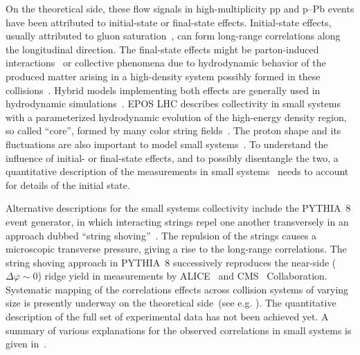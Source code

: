 On the theoretical side, these flow signals in high-multiplicity pp and p--Pb events have been attributed to initial-state or final-state effects. Initial-state effects, usually attributed to gluon saturation~\cite{Dusling:2012cg,Bzdak:2013zma}, can form long-range
correlations along the longitudinal direction. The final-state effects might be parton-induced interactions~\cite{Arbuzov:2011yr} or collective phenomena due to hydrodynamic behavior of the produced matter arising in a high-density system possibly formed in these collisions~\cite{Weller:2017tsr,Zhao:2017rgg}. 
Hybrid models implementing both effects are generally used in hydrodynamic simulations~\cite{Greif:2017bnr,Mantysaari:2017cni}. EPOS LHC describes collectivity in small systems with a parameterized hydrodynamic evolution of the high-energy density region, so called ``core'', formed by many color string fields~\cite{Pierog:2013ria}.
The proton shape and its fluctuations are also important to model small systems~\cite{Mantysaari:2017cni}.
To understand the influence of initial- or final-state effects, and to possibly disentangle the two, a quantitative description of the measurements in small systems~\cite{Schenke:2019pmk,Schenke:2020mbo} needs to account for details of the initial state.

Alternative descriptions for the small systems collectivity include the PYTHIA~8 event generator, in which interacting strings repel one another transversely in an approach dubbed ``string shoving''~\cite{Bierlich:2017vhg}. The repulsion of the strings causes a microscopic transverse pressure, giving a rise to the long-range correlations. The string shoving approach in PYTHIA~8 successively reproduces the near-side ($\Delta\varphi\sim0$) ridge yield in measurements by ALICE~\cite{ALICE:2021nir} and CMS~\cite{Khachatryan:2016txc} Collaboration. Systematic mapping of the correlations effects across collision systems of varying size is presently underway on the theoretical side~(see e.g. \cite{Schenke:2020mbo}).
The quantitative description of the full set of experimental data has not been achieved yet. A summary of various explanations for the observed correlations in small systems is given in~\cite{Strickland:2018exs,Loizides:2016tew,Nagle:2018nvi}. 

